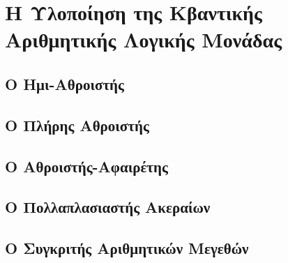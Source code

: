 \chapter{Η Υλοποίηση της Κβαντικής Αριθμητικής Λογικής Μονάδας}

\section{Ο Ημι-Αθροιστής}
\section{Ο Πλήρης Αθροιστής}
\section{Ο Αθροιστής-Αφαιρέτης}
\section{Ο Πολλαπλασιαστής Ακεραίων}
\section{Ο Συγκριτής Αριθμητικών Μεγεθών}
